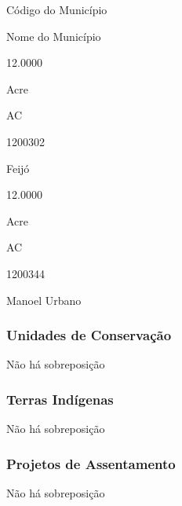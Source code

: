 \documentclass[
  11pt,
  a4paper,
  DIV=11,
  numbers=noendperiod]{scrartcl}
\begin{document}
\n      

Código do Município

\n      

Nome do Município

\n    

\n  

\n  

\n    

\n      

12.0000

\n      

Acre

\n      

AC

\n      

1200302

\n      

Feijó

\n    

\n    

\n      

12.0000

\n      

Acre

\n      

AC

\n      

1200344

\n      

Manoel Urbano

\n    

\n  

\n

\subsubsection{Unidades de
Conservação}\label{unidades-de-conservauxe7uxe3o-1}

Não há sobreposição

\subsubsection{Terras Indígenas}\label{terras-induxedgenas-1}

Não há sobreposição

\subsubsection{Projetos de
Assentamento}\label{projetos-de-assentamento-1}

Não há sobreposição
\end{document}
